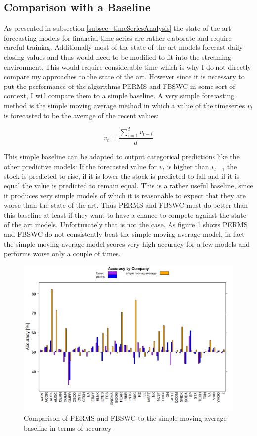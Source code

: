 \subsection{Comparison with a Baseline}
As presented in subsection \ref{subsec_timeSeriesAnalysis} the state of the art forecasting models for financial time series are rather elaborate and require careful training. Additionally most of the state of the art models forecast daily closing values and thus would need to be modified to fit into the streaming environment. This would require considerable time which is why I do not directly compare my approaches to the state of the art. However since it is necessary to put the performance of the algorithms PERMS and FBSWC in some sort of context, I will compare them to a simple baseline. A very simple forecasting method is the simple moving average method \cite{makridakis1982accuracy} in which a value of the timeseries $v_t$ is forecasted to be the average of the recent values:

\[v_t = \frac{\sum_{i=1}^d v_{t-i}}{d}\] 

This simple baseline can be adapted to output categorical predictions like the other predictive models: If the forecasted value for $v_t$ is higher than $v_{t-1}$ the stock is predicted to rise, if it is lower the stock is predicted to fall and if it is equal the value is predicted to remain equal. This is a rather useful baseline, since it produces very simple models of which it is reasonable to expect that they are worse than the state of the art. Thus PERMS and FBSWC must do better than this baseline at least if they want to have a chance to compete against the state of the art models. Unfortunately that is not the case. As figure \ref{fig_baselineComparisonBarchart} shows PERMS and FBSWC do not consistently beat the simple moving average model, in fact the simple moving average model scores very high accuracy for a few models and performs worse only a couple of times.

\begin{figure}[h]
	\centering
  	\includegraphics[width=\textwidth]{baselineComparisonBarchart}
	\caption[Accuracy Baseline Comparison]{Comparison of PERMS and FBSWC to the simple moving average baseline in terms of accuracy}
	\label{fig_baselineComparisonBarchart}
\end{figure}

